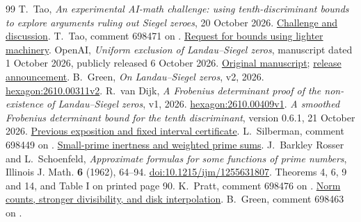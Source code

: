 \documentclass[11pt]{article}
\begin{document}
\begin{thebibliography}{99}
 T.~Tao, \emph{An experimental AI-math challenge: using
tenth-discriminant bounds to explore arguments ruling out Siegel zeroes},
20 October 2026.
\href{https://terrytao.wordpress.com/2026/10/20/an-experimental-ai-math-challenge-using-tenth-discriminant-bounds-to-explore-arguments-ruling-out-siegel-zeroes/}{Challenge and discussion}.
 T.~Tao, comment 698471 on \cite{tao}.
\href{https://terrytao.wordpress.com/2026/10/20/an-experimental-ai-math-challenge-using-tenth-discriminant-bounds-to-explore-arguments-ruling-out-siegel-zeroes/comment-page-1/\#comment-698471}{Request for bounds using lighter machinery}.
 OpenAI, \emph{Uniform exclusion of Landau--Siegel zeros},
manuscript dated 1 October 2026, publicly released 6 October 2026.
\href{https://github.com/openai/math/blob/main/preprints/Uniform-exclusion-of-Landau-Siegel-zeros-October-1-2026/paper.pdf}{Original manuscript};
\href{https://openai.com/index/sharing-ai-progress-in-mathematics/}{release announcement}.
 B.~Green, \emph{On Landau--Siegel zeros}, v2, 2026.
\href{https://hexagonmath.org/2610.00311v2}{hexagon:2610.00311v2}.
 R.~van Dijk, \emph{A Frobenius determinant proof of
the non-existence of Landau--Siegel zeros}, v1, 2026.
\href{https://hexagonmath.org/2610.00409v1}{hexagon:2610.00409v1}.
 \emph{A smoothed Frobenius determinant bound for the tenth
discriminant}, version 0.6.1, 21 October 2026.
\href{https://github.com/twinheterodox/tenth-discriminant/releases/tag/v0.6.1}{Previous exposition and fixed interval certificate}.
 L.~Silberman, comment 698449 on \cite{tao}.
\href{https://terrytao.wordpress.com/2026/10/20/an-experimental-ai-math-challenge-using-tenth-discriminant-bounds-to-explore-arguments-ruling-out-siegel-zeroes/comment-page-1/\#comment-698449}{Small-prime inertness and weighted prime sums}.
 J.~Barkley Rosser and L.~Schoenfeld,
\emph{Approximate formulas for some functions of prime numbers},
Illinois J. Math. \textbf{6} (1962), 64--94.
\href{https://doi.org/10.1215/ijm/1255631807}{doi:10.1215/ijm/1255631807}.
Theorems 4, 6, 9 and 14, and Table I on printed page 90.
 K.~Pratt, comment 698476 on \cite{tao}.
\href{https://terrytao.wordpress.com/2026/10/20/an-experimental-ai-math-challenge-using-tenth-discriminant-bounds-to-explore-arguments-ruling-out-siegel-zeroes/comment-page-1/\#comment-698476}{Norm counts, stronger divisibility, and disk interpolation}.
 B.~Green, comment 698463 on \cite{tao}.

\end{thebibliography}
\end{document}
